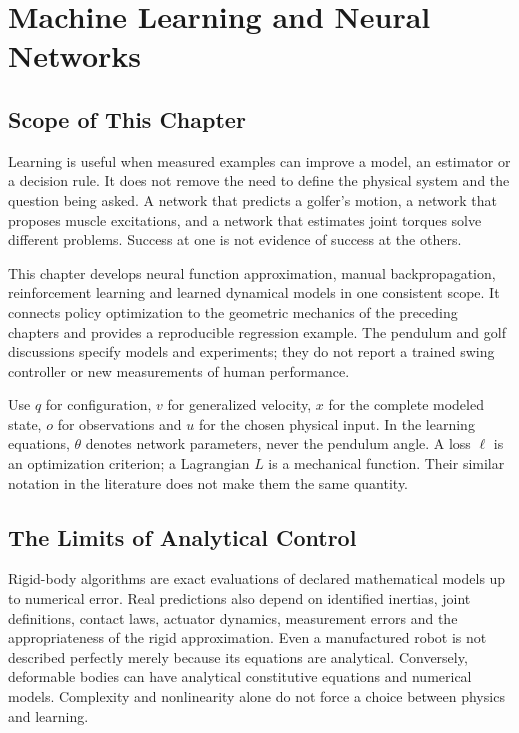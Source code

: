 \chapter{Machine Learning and Neural Networks}
\label{ch:machine_learning}

\section{Scope of This Chapter}

Learning is useful when measured examples can improve a model, an estimator or a decision rule. It does not remove the need to define the physical system and the question being asked. A network that predicts a golfer's motion, a network that proposes muscle excitations, and a network that estimates joint torques solve different problems. Success at one is not evidence of success at the others.

This chapter develops neural function approximation, manual backpropagation, reinforcement learning and learned dynamical models in one consistent scope. It connects policy optimization to the geometric mechanics of the preceding chapters and provides a reproducible regression example. The pendulum and golf discussions specify models and experiments; they do not report a trained swing controller or new measurements of human performance.

Use $q$ for configuration, $v$ for generalized velocity, $x$ for the complete modeled state, $o$ for observations and $u$ for the chosen physical input. In the learning equations, $\theta$ denotes network parameters, never the pendulum angle. A loss $\ell$ is an optimization criterion; a Lagrangian $L$ is a mechanical function. Their similar notation in the literature does not make them the same quantity.

\section{The Limits of Analytical Control}

Rigid-body algorithms are exact evaluations of declared mathematical models up to numerical error. Real predictions also depend on identified inertias, joint definitions, contact laws, actuator dynamics, measurement errors and the appropriateness of the rigid approximation. Even a manufactured robot is not described perfectly merely because its equations are analytical. Conversely, deformable bodies can have analytical constitutive equations and numerical models. Complexity and nonlinearity alone do not force a choice between physics and learning.

